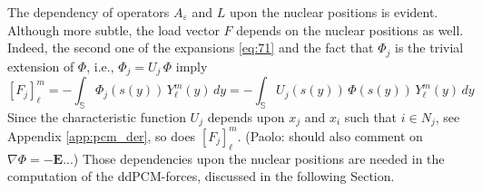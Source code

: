The dependency of operators $A_\varepsilon$ and $L$ upon the nuclear positions is evident. Although more subtle, the load vector $F$ depends on the nuclear positions as well. Indeed, the second one of the expansions \eqref{eq:71} and the fact that $\Phi_j$ is the trivial extension of $\Phi$, i.e., $\Phi_j = U_j \, \Phi$ imply
\begin{equation}\label{eq:25}
[F_j]_\ell^m = - \int_{\mathbb{S}} \Phi_j(s(y)) \, Y_\ell^m(y) \,dy = - \int_{\mathbb{S}} U_j(s(y)) \, \Phi(s(y)) \, Y_\ell^m(y) \,dy
\end{equation}
Since the characteristic function $U_j$ depends upon $x_j$ and $x_i$ such that $i \in N_j$, see Appendix \ref{app:pcm_der}, so does $[F_j]_\ell^m$. {\color{red}(Paolo: should also comment on $\nabla \Phi = - \boldsymbol{E} $...)} Those dependencies upon the nuclear positions are needed in the computation of the ddPCM-forces, discussed in the following Section.


%
%
%

